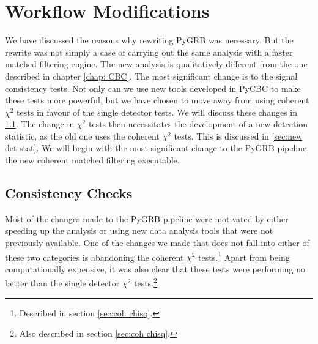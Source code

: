 \documentclass[11pt]{cuthesis}
\begin{document}
\section{Workflow Modifications} \label{sec:pygrb changes}
We have discussed the reasons why rewriting PyGRB was necessary. But the rewrite was not simply a case of carrying out the same analysis with a faster matched filtering engine. The new analysis is qualitatively different from the one described in chapter \ref{chap: CBC}. The most significant change is to the signal consistency tests. Not only can we use new tools developed in PyCBC to make these tests more powerful, but we have chosen to move away from using coherent $\chi^2$ tests in favour of the single detector tests. We will discuss these changes in \ref{sec:new chisq}. The change in $\chi^2$ tests then necessitates the development of a new detection statistic, as the old one uses the coherent $\chi^2$ tests. This is discussed in \ref{sec:new det stat}. We will begin with the most significant change to the PyGRB pipeline, the new coherent matched filtering executable.

\subsection{Consistency Checks} \label{sec:new chisq}
Most of the changes made to the PyGRB pipeline were motivated by either speeding up the analysis or using new data analysis tools that were not previously available. One of the changes we made that does not fall into either of these two categories is abandoning the coherent $\chi^2$ tests.\footnote{Described in section \ref{sec:coh chisq}.} Apart from being computationally expensive, it was also clear that these tests were performing no better than the single detector $\chi^2$ tests.\footnote{Also described in section \ref{sec:coh chisq}.} 
\end{document}
